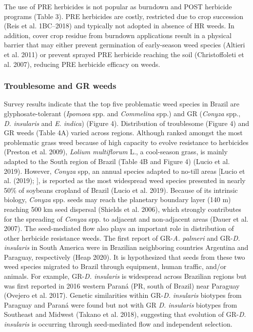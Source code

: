 \documentclass[
  12pt,
  a4paper]{article}
\begin{document}
The use of PRE herbicides is not popular as burndown and POST herbicide
programs (Table 3). PRE herbicides are costly, restricted due to crop
succession (Reis et al. 1BC--2018) and typically not adopted in absence
of HR weeds. In addition, cover crop residue from burndown applications
result in a physical barrier that may either prevent germination of
early-season weed species (Altieri et al. 2011) or prevent sprayed PRE
herbicide reaching the soil (Christoffoleti et al. 2007), reducing PRE
herbicide efficacy on weeds.

\hypertarget{troublesome-and-gr-weeds}{%
\subsubsection{Troublesome and GR
weeds}\label{troublesome-and-gr-weeds}}

Survey results indicate that the top five problematic weed species in
Brazil are glyphosate-tolerant (\emph{Ipomoea} spp. and \emph{Commelina}
spp.) and GR (\emph{Conyza} spp., \emph{D. insularis} and \emph{E.
indica}) (Figure 4). Distribution of troublesome (Figure 4) and GR weeds
(Table 4A) varied across regions. Although ranked amongst the most
problematic grass weed because of high capacity to evolve resistance to
herbicides (Preston et al. 2009), \emph{Lolium multiflorum} L., a
cool-season grass, is mainly adapted to the South region of Brazil
(Table 4B and Figure 4) (Lucio et al. 2019). However, \emph{Conyza} spp,
an annual species adapted to no-till areas {[}Lucio et al. (2019); {]},
is reported as the most widespread weed species presented in nearly 50\%
of soybeans cropland of Brazil (Lucio et al. 2019). Because of its
intrinsic biology, \emph{Conyza} spp. seeds may reach the planetary
boundary layer (140 m) reaching 500 km seed dispersal (Shields et al.
2006), which strongly contributes for the spreading of \emph{Conyza}
spp. to adjacent and non-adjacent areas (Dauer et al. 2007). The
seed-mediated flow also plays an important role in distribution of other
herbicide resistance weeds. The first report of GR-\emph{A. palmeri} and
GR-\emph{D. insularis} in South America were in Brazilian neighboring
countries Argentina and Paraguay, respectively (Heap 2020). It is
hypothesized that seeds from these two weed species migrated to Brazil
through equipment, human traffic, and/or animals. For example,
GR-\emph{D. insularis} is widespread across Brazilian regions but was
first reported in 2016 western Paraná (PR, south of Brazil) near
Paraguay (Ovejero et al. 2017). Genetic similarities within GR-\emph{D.
insularis} biotypes from Paraguay and Paraná were found but not with GR
\emph{D. insularis} biotypes from Southeast and Midwest (Takano et al.
2018), suggesting that evolution of GR-\emph{D. insularis} is occurring
through seed-mediated flow and independent selection.
\end{document}
